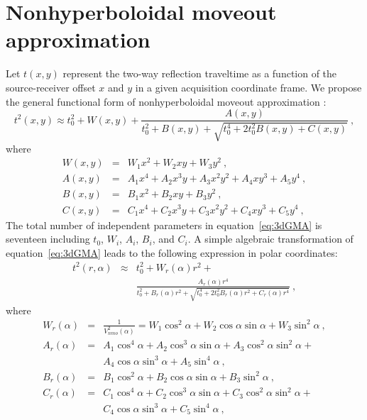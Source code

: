 \section{Nonhyperboloidal moveout approximation}

Let $t(x,y)$ represent the two-way reflection traveltime as a function of the source-receiver offset  $x$ and $y$ in a given acquisition coordinate frame. We propose the  general functional form of nonhyperboloidal moveout approximation :
\begin{equation}
\label{eq:3dGMA}
t^2(x,y) \approx t^2_0 + W(x,y) + \frac{A(x,y)}{t^2_0+B(x,y)+\sqrt{t^4_0+2t^2_0B(x,y)+C(x,y)}} ~,
\end{equation} 
where
\begin{eqnarray}
\nonumber
W(x,y) & = & W_1x^2+ W_2xy+ W_3y^2~,\\
\nonumber
A(x,y) & = & A_1x^4+A_2x^3y+A_3x^2y^2+A_4xy^3+A_5y^4~,\\
\nonumber
B(x,y) & = & B_1x^2+B_2xy+B_3y^2~,\\
\nonumber
C(x,y) & = & C_1x^4+C_2x^3y+C_3x^2y^2+C_4xy^3+C_5y^4~,
\end{eqnarray}
 The total number of independent parameters in equation~\ref{eq:3dGMA} is seventeen including $t_0$, $W_i$, $A_i$, $B_i$, and $C_i$.  A simple algebraic transformation of equation~\ref{eq:3dGMA} leads to the following expression in polar coordinates:
\begin{eqnarray}
\label{eq:3dGMAr}
t^2(r,\alpha) & \approx & t^2_0 + W_r(\alpha) r^2 + \\
\nonumber
                && \frac{A_r(\alpha) r^4}{t^2_0+B_r(\alpha) r^2+\sqrt{t^4_0+2t^2_0B_r(\alpha) r^2+C_r(\alpha) r^4}} ~,
\end{eqnarray} 
where
\begin{eqnarray}
\nonumber
W_r(\alpha) & = & \frac{1}{V^2_{nmo}(\alpha)} = W_1\cos^2 \alpha+W_2\cos \alpha \sin \alpha + W_3\sin^2 \alpha~,\\
\nonumber
A_r(\alpha) & = & A_1\cos^4 \alpha+A_2\cos^3 \alpha \sin \alpha+A_3\cos^2 \alpha \sin^2 \alpha+ \\
\nonumber
            && A_4\cos \alpha \sin^3 \alpha+A_5\sin^4 \alpha~,\\
\nonumber
B_r(\alpha) & = & B_1\cos^2 \alpha+B_2\cos \alpha \sin \alpha+B_3\sin^2 \alpha~,\\
\nonumber
C_r(\alpha) & = & C_1\cos^4 \alpha+C_2\cos^3 \alpha \sin \alpha+C_3\cos^2 \alpha \sin^2 \alpha+ \\
\nonumber
            && C_4\cos \alpha \sin^3 \alpha+C_5\sin^4 \alpha~,
\end{eqnarray}
